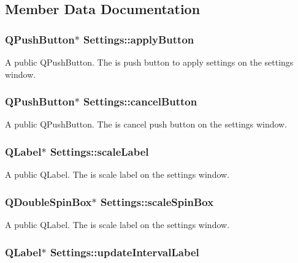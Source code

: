 \subsection{Member Data Documentation}
\hypertarget{classSettings_a446dbdae4ee22356337bdd0e9dab6d28}{
\subsubsection[{applyButton}]{\setlength{\rightskip}{0pt plus 5cm}QPushButton$\ast$ {\bf Settings::applyButton}}}
\label{classSettings_a446dbdae4ee22356337bdd0e9dab6d28}
A public QPushButton. The is push button to apply settings on the settings window. \hypertarget{classSettings_a0ba00fafc6bd37a3a4fb6cddfe65cfbe}{
\subsubsection[{cancelButton}]{\setlength{\rightskip}{0pt plus 5cm}QPushButton$\ast$ {\bf Settings::cancelButton}}}
\label{classSettings_a0ba00fafc6bd37a3a4fb6cddfe65cfbe}
A public QPushButton. The is cancel push button on the settings window. \hypertarget{classSettings_a6b604fade5b78035a964c1b64f868a9e}{
\subsubsection[{scaleLabel}]{\setlength{\rightskip}{0pt plus 5cm}QLabel$\ast$ {\bf Settings::scaleLabel}}}
\label{classSettings_a6b604fade5b78035a964c1b64f868a9e}
A public QLabel. The is scale label on the settings window. \hypertarget{classSettings_a0e9f71e47a312e06db46fcad5d287d76}{
\subsubsection[{scaleSpinBox}]{\setlength{\rightskip}{0pt plus 5cm}QDoubleSpinBox$\ast$ {\bf Settings::scaleSpinBox}}}
\label{classSettings_a0e9f71e47a312e06db46fcad5d287d76}
A public QLabel. The is scale label on the settings window. \hypertarget{classSettings_a292d6416ebf86b8e3a58bda7075e4f3e}{
\subsubsection[{updateIntervalLabel}]{\setlength{\rightskip}{0pt plus 5cm}QLabel$\ast$ {\bf Settings::updateIntervalLabel}}}
